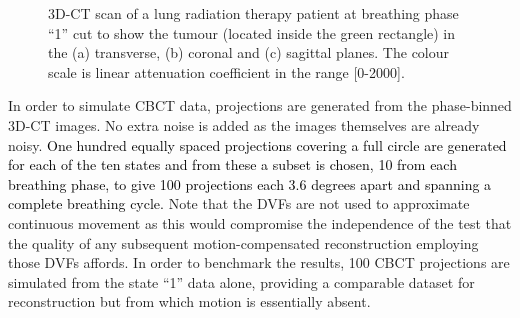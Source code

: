 \begin{figure}[H]
\begin{center}
{}\hfill
{}\hfill
\hspace*{\fill} 

\caption{\label{fig:realthorax} 3D-CT scan of a lung radiation therapy patient at breathing phase ``1'' cut to show the tumour (located inside the green rectangle) in the (a) transverse, (b) coronal and (c) sagittal planes.  The colour scale is linear attenuation coefficient in the range [0-2000].} 
\end{center} 
\end{figure}



In order to simulate CBCT data, projections are generated from the phase-binned 3D-CT images.  No extra noise is added as the images themselves are already noisy.  \textcolor{black}{One hundred equally spaced projections covering a full circle are generated for each of the ten states and from these a subset is chosen, 10 from each breathing phase, to give 100 projections each 3.6 degrees apart and spanning a complete breathing cycle.}  Note that the DVFs are not used to approximate continuous movement as this would compromise the independence of the test that the quality of any subsequent motion-compensated reconstruction employing those DVFs affords.  In order to benchmark the results, 100 CBCT projections are simulated from the state ``1'' data alone, providing a comparable dataset for reconstruction but from which motion is essentially absent.

